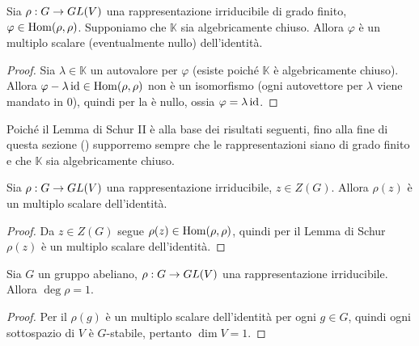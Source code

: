 \begin{proposition}
Sia $\rho:G\to GL(V)$ una rappresentazione irriducibile di grado finito, $\varphi\in\operatorname{Hom}(\rho,\rho)$. Supponiamo che $\mathbb{K}$ sia algebricamente chiuso. Allora $\varphi$ è un multiplo scalare (eventualmente nullo) dell'identità.
\end{proposition}
\begin{proof}
Sia $\lambda\in\mathbb{K}$ un autovalore per $\varphi$ (esiste poiché $\mathbb{K}$ è algebricamente chiuso). Allora $\varphi-\lambda\operatorname{id}\in\operatorname{Hom}(\rho,\rho)$ non è un isomorfismo (ogni autovettore per $\lambda$ viene mandato in 0), quindi per la  è nullo, ossia $\varphi=\lambda\operatorname{id}$.
\end{proof}

Poiché il Lemma di Schur II è alla base dei risultati seguenti, fino alla fine di questa sezione () supporremo sempre che le rappresentazioni siano di grado finito e che $\mathbb{K}$ sia algebricamente chiuso.

\begin{corollary}
Sia $\rho:G\to GL(V)$ una rappresentazione irriducibile, $z\in Z(G)$.  Allora $\rho(z)$ è un multiplo scalare dell'identità.
\end{corollary}
\begin{proof}
Da $z\in Z(G)$ segue $\rho(z)\in\operatorname{Hom}(\rho,\rho)$, quindi per il Lemma di Schur $\rho(z)$ è un multiplo scalare dell'identità.
\end{proof}

\begin{corollary}
Sia $G$ un gruppo abeliano, $\rho:G\to GL(V)$ una rappresentazione irriducibile. Allora $\deg\rho=1$.
\end{corollary}
\begin{proof}
Per il  $\rho(g)$ è un multiplo scalare dell'identità per ogni $g\in G$, quindi ogni sottospazio di $V$ è $G$-stabile, pertanto $\dim V=1$.
\end{proof}

